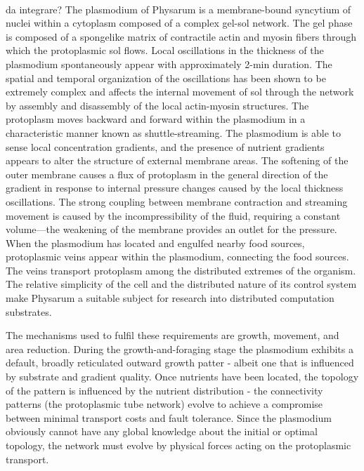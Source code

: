 \\ da integrare?
The plasmodium of Physarum is a membrane-bound syncytium of nuclei within a cytoplasm composed of a complex gel-sol network. The gel phase is composed of a spongelike matrix of contractile actin and myosin fibers through which the protoplasmic sol flows. Local oscillations in the thickness of the plasmodium spontaneously appear with approximately 2-min duration. The spatial and temporal organization of the oscillations has been shown to be extremely complex and affects the internal movement of sol through the network by assembly and disassembly of the local actin-myosin structures. The protoplasm moves backward and forward within the plasmodium in a characteristic manner known as shuttle-streaming.
The plasmodium is able to sense local concentration gradients, and the presence of nutrient gradients appears to alter the structure of external membrane areas. The softening of the outer membrane causes a flux of protoplasm in the general direction of the gradient in response to internal pressure changes caused by the local thickness oscillations. The strong coupling between membrane contraction and streaming movement is caused by the incompressibility of the fluid, requiring a constant volume—the weakening of the membrane provides an outlet for the pressure. When the plasmodium has located and engulfed nearby food sources, protoplasmic veins appear within the plasmodium, connecting the food sources. The veins transport protoplasm among the distributed extremes of the organism.
The relative simplicity of the cell and the distributed nature of its control system make Physarum a suitable subject for research into distributed computation substrates. \cite{jones2010characteristics}

The mechanisms used to fulfil these requirements are growth, movement, and area reduction. During the growth-and-foraging stage the plasmodium exhibits a default, broadly reticulated outward growth patter - albeit one that is influenced by substrate and gradient quality. Once nutrients have been located, the topology of the pattern is influenced by the nutrient distribution - the connectivity patterns (the protoplasmic tube network) evolve to achieve a compromise between minimal transport costs and
fault tolerance. Since the plasmodium obviously cannot have any global knowledge about the initial or optimal topology, the network must evolve by physical forces acting on the protoplasmic transport.